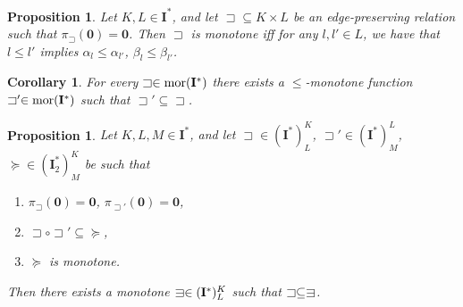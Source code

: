 \documentclass[12pt]{amsart}
\numberwithin{equation}{section}
\theoremstyle{plain}
\newtheorem{corollary}[theorem]{\bf Corollary}
\newtheorem{proposition}[theorem]{\bf Proposition}
\theoremstyle{definition}
\newcommand{\nil}{\mathrel{\vphantom{>}\text{\mathsurround=0pt\ooalign{$>$\cr$-$\cr}}}}
\newcommand{\sqni}{\mathrel{\vphantom{\sqsupset}\text{\mathsurround=0pt\ooalign{$\sqsupset$\cr$-$\cr}}}}
\newcommand \sqsp{\sqsupset}
\newcommand \sqsb{\sqsubset}
\newcommand \mor{{\rm{mor}}}
\newcommand \rt{\mathbf{0}}
\newcommand \IIb{\mathbf{I}}
\newcommand \JJb{\mathbf{J}}
\newcommand \LLb{\mathbf{L}}
\newcommand \IIub{\underline{\mathbf{I}}}
\begin{document}
 \begin{proposition}
 	Let $K, L \in \IIb^*$, and let $\sqsp \subseteq K \times L$ be an edge-preserving relation such that $\pi_{\sqsp}(\rt)=\rt$. Then $\sqsp$ is monotone iff for any $l,l' \in L$, we have that $l \leq l'$ implies $\alpha_{l} \leq \alpha_{l'}$, $\beta_{l} \leq \beta_{l'}$.
 \end{proposition} 
 
 \begin{corollary}
 For every $\sqsp \in \mor(\IIb^*)$ there exists a $\leq$-monotone function $\sqsp' \in \mor(\IIb^*)$ such that $\sqsp' \subseteq \sqsp$.
 \end{corollary} 
 
 
 
 \begin{proposition}
 \label{co:G_I*Dense}
 	Let $K,L,M \in \IIb^*$, and let $\sqsp \in (\IIb^*)^K_L$, $\sqsp' \in (\IIb^*)^L_M$, $\succeq \in (\IIb_2^*)^K_M$ be such that
 	\begin{enumerate}
 		\item $\pi_{\sqsp}(\rt)=\rt$, $\pi_{\sqsp'}(\rt)=\rt$,
 		\item $\sqsp \circ \sqsp' \subseteq \succeq$,
 		\item $\succeq$ is monotone.
 	\end{enumerate}
 	Then there exists a monotone $\sqni \in (\IIb^*)^K_L$ such that $\sqsp \subseteq \sqni$.
 \end{proposition}
  

\end{document}
